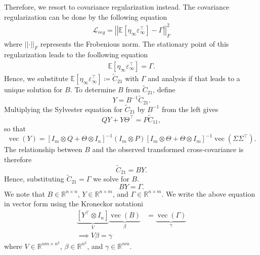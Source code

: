 \documentclass[11pt]{article}
\begin{document}
Therefore, we resort to covariance regularization instead. The covariance regularization can be done by the following equation
\begin{align}
    \mathcal{L}_{reg} = \left|\left|\mathbb{E}[\eta_\infty \varepsilon_\infty^{\top}] - \Gamma\right|\right|_{F}^2
\end{align}
where $\left| \left| \cdot \right|\right|_{F}$ represents the Frobenious norm. The stationary point of this regularization leads to the foollowing equation
\begin{align}
    \mathbb{E}[\eta_\infty \varepsilon_\infty^{\top}] = \Gamma.
\end{align}
Hence, we substitute $\mathbb{E}[\eta_\infty \varepsilon_\infty^{\top}] \coloneqq \widetilde{C}_{21}$ with $\Gamma$ and analysis if that leads to a unique solution for $B$.
To determine $B$ from $\widetilde{C}_{21}$, define
\begin{equation}
    Y=B^{-1}\widetilde{C}_{21}.
\end{equation}
Multiplying the Sylvester equation for $\widetilde{C}_{21}$ by $B^{-1}$
from the left gives
\begin{equation}
    QY+Y\Theta^{\top}=P\widetilde{C}_{11},
\end{equation}
so that
\begin{equation}
    \operatorname{vec}(Y)
    =\left[I_m\otimes Q+\Theta\otimes I_n\right]^{-1}
    (I_m\otimes P)
    \left[I_m\otimes\Theta+\Theta\otimes I_m\right]^{-1}
    \operatorname{vec}(\Sigma\Sigma^{\top}).
\end{equation}
The relationship between $B$ and the observed transformed cross-covariance is
therefore
\begin{equation}
    \widetilde{C}_{21}=BY.
\end{equation}
Hence, substituting $\widetilde{C}_{21} = \Gamma$ we solve for $B$.
\begin{equation}
    BY = \Gamma.
\end{equation}
We note that $B \in \mathbb{R}^{n \times n}$, $Y \in \mathbb{R}^{n \times m}$, and $\Gamma \in \mathbb{R}^{n \times m}$.
We write the above equation in vector form using the Kroneckor notationi
\begin{align}
    \underbrace{[Y^\top \otimes I_n]}_{V} \underbrace{\operatorname{vec}(B)}_{\beta} & = \underbrace{\operatorname{vec}(\Gamma)}_{\gamma} \\
    \implies V \beta = \gamma
\end{align}
where $V \in \mathbb{R}^{nm \times n^2}$, $\beta \in \mathbb{R}^{n^2}$, and $\gamma \in \mathbb{R}^{nm}$.
\end{document}
